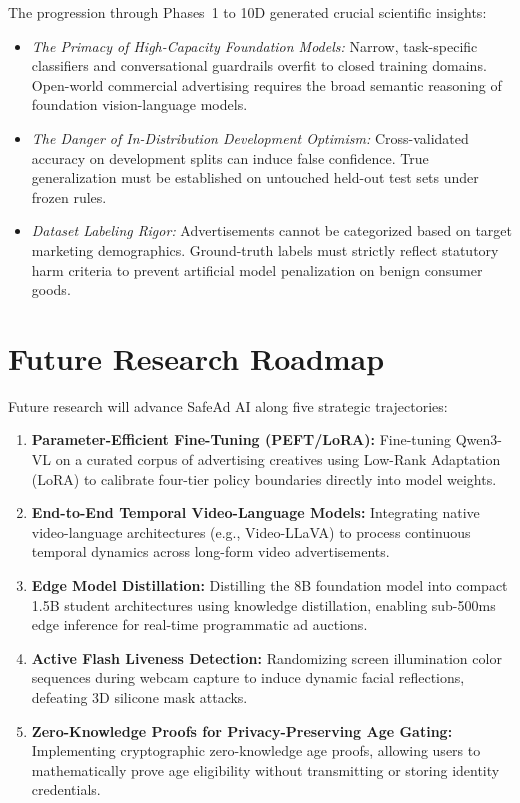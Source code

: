 \documentclass[12pt,a4paper]{report}
\begin{document}
The progression through Phases~1 to 10D generated crucial scientific insights:
\begin{itemize}
    \item \emph{The Primacy of High-Capacity Foundation Models:} Narrow, task-specific classifiers and conversational guardrails overfit to closed training domains. Open-world commercial advertising requires the broad semantic reasoning of foundation vision-language models.
    \item \emph{The Danger of In-Distribution Development Optimism:} Cross-validated accuracy on development splits can induce false confidence. True generalization must be established on untouched held-out test sets under frozen rules.
    \item \emph{Dataset Labeling Rigor:} Advertisements cannot be categorized based on target marketing demographics. Ground-truth labels must strictly reflect statutory harm criteria to prevent artificial model penalization on benign consumer goods.
\end{itemize}

\section{Future Research Roadmap}

Future research will advance SafeAd AI along five strategic trajectories:
\begin{enumerate}
    \item \textbf{Parameter-Efficient Fine-Tuning (PEFT/LoRA):} Fine-tuning Qwen3-VL on a curated corpus of advertising creatives using Low-Rank Adaptation (LoRA) to calibrate four-tier policy boundaries directly into model weights.
    \item \textbf{End-to-End Temporal Video-Language Models:} Integrating native video-language architectures (e.g., Video-LLaVA) to process continuous temporal dynamics across long-form video advertisements.
    \item \textbf{Edge Model Distillation:} Distilling the 8B foundation model into compact 1.5B student architectures using knowledge distillation, enabling sub-500ms edge inference for real-time programmatic ad auctions.
    \item \textbf{Active Flash Liveness Detection:} Randomizing screen illumination color sequences during webcam capture to induce dynamic facial reflections, defeating 3D silicone mask attacks.
    \item \textbf{Zero-Knowledge Proofs for Privacy-Preserving Age Gating:} Implementing cryptographic zero-knowledge age proofs, allowing users to mathematically prove age eligibility without transmitting or storing identity credentials.
\end{enumerate}
\end{document}
